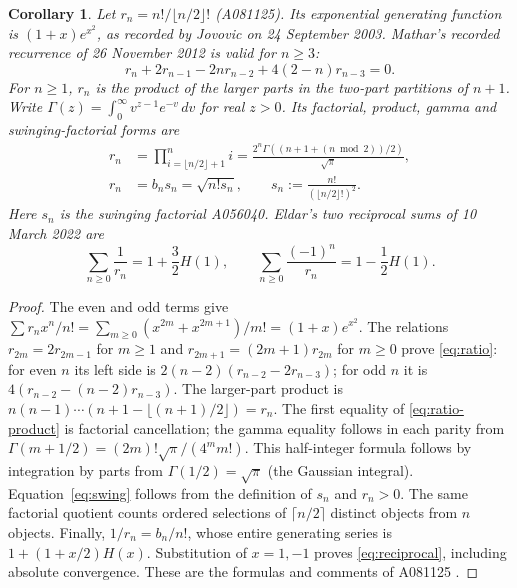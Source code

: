 \documentclass[11pt]{article}
\newtheorem{corollary}{Corollary}
\begin{document}
\begin{corollary}\label{cor:ratio}
Let $r_n=n!/\lfloor n/2\rfloor!$ (A081125). Its exponential generating
function is $(1+x)e^{x^2}$, as recorded by Jovovic on 24 September 2003.
Mathar's recorded recurrence of 26 November 2012 is valid for $n\geq3$:
\begin{equation}\label{eq:ratio}
 r_n+2r_{n-1}-2nr_{n-2}+4(2-n)r_{n-3}=0.
\end{equation}
For $n\geq1$, $r_n$ is the product of the larger parts in the two-part
partitions of $n+1$. Write
$\Gamma(z)=\int_0^\infty v^{z-1}e^{-v}\,dv$ for real $z>0$.
Its factorial, product, gamma and swinging-factorial forms are
\begin{align}
 r_n&=\prod_{i=\lfloor n/2\rfloor+1}^{n}i
 =\frac{2^n\Gamma((n+1+(n\bmod2))/2)}{\sqrt\pi},\label{eq:ratio-product}\\
 r_n&=b_n s_n=\sqrt{n!s_n},\qquad
 s_n:=\frac{n!}{(\lfloor n/2\rfloor!)^2}.\label{eq:swing}
\end{align}
Here $s_n$ is the swinging factorial A056040.
Eldar's two reciprocal sums of 10 March 2022 are
\begin{equation}\label{eq:reciprocal}
 \sum_{n\geq0}\frac1{r_n}=1+\frac32 H(1),\qquad
 \sum_{n\geq0}\frac{(-1)^n}{r_n}=1-\frac12 H(1).
\end{equation}
\end{corollary}
\begin{proof}
The even and odd terms give
$\sum r_nx^n/n!=\sum_{m\geq0}(x^{2m}+x^{2m+1})/m!=(1+x)e^{x^2}$.
The relations $r_{2m}=2r_{2m-1}$ for $m\geq1$ and
$r_{2m+1}=(2m+1)r_{2m}$ for $m\geq0$ prove \eqref{eq:ratio}:
for even $n$ its left side is
$2(n-2)(r_{n-2}-2r_{n-3})$; for odd $n$ it is
$4(r_{n-2}-(n-2)r_{n-3})$.
The larger-part product is
$n(n-1)\cdots(n+1-\lfloor(n+1)/2\rfloor)=r_n$.
The first equality of \eqref{eq:ratio-product} is factorial cancellation;
the gamma equality follows in each parity from
$\Gamma(m+1/2)=(2m)!\sqrt\pi/(4^mm!)$.
This half-integer formula follows by integration by parts from
$\Gamma(1/2)=\sqrt\pi$ (the Gaussian integral).
Equation~\eqref{eq:swing} follows from the definition of $s_n$ and $r_n>0$.
The same factorial quotient counts ordered selections of
$\lceil n/2\rceil$ distinct objects from $n$ objects.
Finally, $1/r_n=b_n/n!$, whose entire generating series is
$1+(1+x/2)H(x)$. Substitution of $x=1,-1$ proves
\eqref{eq:reciprocal}, including absolute convergence.
These are the formulas and comments of A081125 \cite{oeis-ratio}.
\end{proof}
\end{document}
